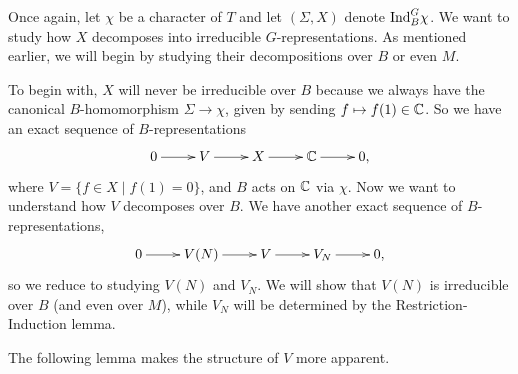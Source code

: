 Once again, let $\chi$ be a character of $T$ and let $(\Sigma,X)$ denote $\mathrm{Ind}_B^G \chi$. We want to study how $X$ decomposes into irreducible $G$-representations. As mentioned earlier, we will begin by studying their decompositions over $B$ or even $M$. 

To begin with, $X$ will never be irreducible over $B$ because we always have the canonical $B$-homomorphism $\Sigma \to \chi$, given by sending $f \mapsto f(1) \in \mathbb{C}$. So we have an exact sequence of $B$-representations
$$\xymatrix{0 \ar[r] & V \ar[r] & X \ar[r] & \CC \ar[r] & 0,}$$
where $V=\{f \in X  \mid f(1)=0\}$, and $B$ acts on $\mathbb{C}$ via $\chi$. Now we want to understand how $V$ decomposes over $B$. We have another exact sequence of $B$-representations,
$$\xymatrix{0 \ar[r] & V(N) \ar[r] & V \ar[r] & V_N \ar[r] & 0,}$$
so we reduce to studying $V(N)$ and $V_N$. We will show that $V(N)$ is irreducible over $B$ (and even over $M$), while $V_N$ will be determined by the Restriction-Induction lemma. 


The following lemma makes the structure of $V$ more apparent.

